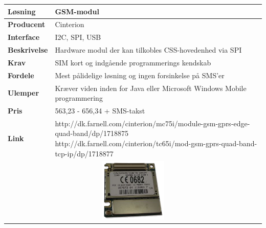 \begin{table}[H] \centering
	\label{tab:GSM1}
\begin{tabular}{|p{6cm}|p{8cm}|}
	\hline
		\textbf{Løsning}				&GSM-modul \\ \hline
		\textbf{Producent} 			&Cinterion \\ \hline
		\textbf{Interface} 			&I2C, SPI, USB \\ \hline
		\textbf{Beskrivelse} 		&Hardware modul der kan tilkobles CSS-hovedenhed via SPI \\ \hline
		\textbf{Krav} 				&SIM kort og indgående programmerings kendskab \\ \hline
		\textbf{Fordele}				&Mest pålidelige løsning og ingen forsinkelse på SMS'er \\ \hline
		\textbf{Ulemper} 			&Kræver viden inden for Java eller Microsoft Windows Mobile programmering \\ \hline
		\textbf{Pris} 				&563,23 - 656,34 + SMS-takst \\ \hline
		\textbf{Link} 				&http://dk.farnell.com/cinterion/mc75i/module-gsm-gprs-edge-quad-band/dp/1718875 \newline
									 http://dk.farnell.com/cinterion/tc65i/mod-gsm-gprs-quad-band-tcp-ip/dp/1718877 \\ \hline
		\multicolumn{2}{|c|}{\includegraphics[height=3cm]{billeder/GSM_TC65I}} 	
\\ \hline

\end{tabular}
\end{table}

